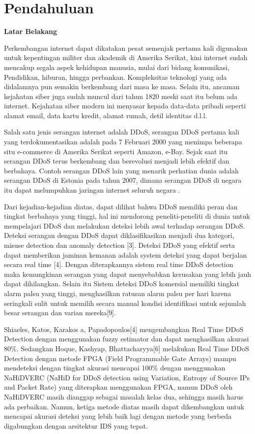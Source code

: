 
\section{Pendahuluan}

\noindent\textbf{Latar Belakang}

Perkembangan internet dapat dikatakan pesat semenjak pertama kali digunakan untuk kepentingan militer dan akademik di Amerika Serikat, kini internet sudah mencakup segala aspek kehidupan manusia, mulai dari bidang komunikasi, Pendidikan, hiburan, hingga perbankan. Kompleksitas teknologi yang ada didalamnya pun semakin berkembang dari masa ke masa. Selain itu, ancaman kejahatan siber juga sudah muncul dari tahun 1820 meski saat itu belum ada internet. Kejahatan siber modern ini menyasar kepada data-data pribadi seperti alamat email, data kartu kredit, alamat rumah, detil identitas d.l.l.

Salah satu jenis serangan internet adalah DDoS, serangan DDoS pertama kali yang terdokumentasikan adalah pada 7 Februari 2000 yang menimpa beberapa situ e-commerce di Amerika Serikat seperti Amazon, e-Bay. Sejak saat itu serangan DDoS terus berkembang dan berevolusi menjadi lebih efektif  dan berbahaya. Contoh serangan DDoS lain yang menarik perhatian dunia adalah serangan DDoS di Estonia pada tahun 2007, dimana serangan DDoS di negara itu dapat melumpuhkan jaringan internet seluruh negara \cite{politicsofddos}.

Dari kejadian-kejadian diatas, dapat dilihat bahwa DDoS memiliki peran dan tingkat berbahaya yang tinggi, hal ini mendorong peneliti-peneliti di dunia untuk mempelajari DDoS dan melakukan deteksi lebih awal terhadap serangan DDoS. Deteksi serangan dengan DDoS dapat diklasifikasikan menjadi dua kategori, misuse detection dan anomaly detection [3]. Deteksi DDoS yang efektif serta dapat memberikan jaminan kemanan adalah system deteksi yang dapat berjalan secara real time [4]. Dengan diterapkannya sistem real time DDoS detection maka kemungkinan serangan yang dapat menyebabkan kerusakan yang lebih jauh dapat dihilangkan. Selain itu Sistem deteksi DDoS komersial memiliki tingkat alarm palsu yang tinggi, menghasilkan ratusan alarm palsu per hari karena seringkali sulit untuk memilih secara manual kondisi identifikasi untuk sejumlah besar serangan dan varian mereka[9].

Shiaeles, Katos, Karakos a, Papadopoulos[4] mengembangkan Real Time DDoS Detection dengan menggunakan fuzzy estimator dan dapat menghasilkan akurasi 80\%. Sedangkan Hoque, Kashyap, Bhattacharyya[6] melakukan Real Time DDoS Detection dengan metode FPGA (Field Programmable Gate Arrays) mampu mendeteksi dengan tingkat akurasi mencapai 100\% dengan menggunakan NaHiDVERC (NaHiD for DDoS detection using Variation, Entropy of Source IPs and Packet Rate) yang diterapkan menggunakan FPGA, namun DDoS oleh NaHiDVERC masih dianggap sebagai masalah kelas dua, sehingga masih harus ada perbaikan. Namun, ketiga metode diatas masih dapat dikembangkan untuk mencapai akurasi deteksi yang lebih baik lagi dengan metode yang berbeda digabungkan dengan arsitektur IDS yang tepat.

